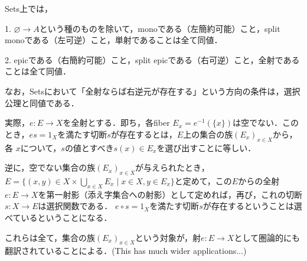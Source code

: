 \documentclass[uplatex, 12pt, dvipdfmx]{jsarticle}
\begin{document}
\begin{example}
    Sets上では，
    
    1. $\varnothing\to A$という種のものを除いて，monoである（左簡約可能）こと，split monoである（左可逆）こと，単射であることは全て同値．
    
    2. epicである（右簡約可能）こと，split epicである（右可逆）こと，全射であることは全て同値．

    \vspace{3cm}
    なお，Setsにおいて「全射ならば右逆元が存在する」という方向の条件は，選択公理と同値である．
    
    実際，$e:E\to X$を全射とする．即ち，各fiber $E_x=e^{-1}(\{x\})$は空でない．このとき，$es=1_X$を満たす切断$s$が存在するとは，$E$上の集合の族$(E_x)_{x\in X}$から，各
    $x$について，$s$の値とすべき$s(x)\in E_x$を選び出すことに等しい．

    \vspace{3cm}
    逆に，空でない集合の族$(E_x)_{x\in X}$が与えられたとき，$E=\{(x,y)\in X\times \bigcup_{x\in X}E_x\mid x\in X, y\in E_x\}$と定めて，この$E$からの全射$e:E\to X$を第一射影（添え字集合への射影）として定めれば，再び，これの切断$s:X\to E$は選択関数である．
    $e\circ s=1_X$を満たす切断$s$が存在するということは選べているということになる．

    これらは全て，集合の族$(E_x)_{x\in X}$という対象が，射$e:E\to X$として圏論的にも翻訳されていることによる．(This has much wider applications...)
\end{example}
\vspace{3cm}
\end{document}
